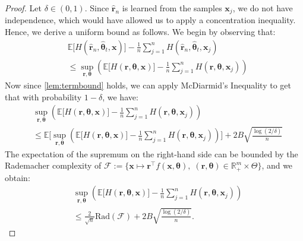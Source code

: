 \begin{proof}
    Let $\delta \in (0,1)$. Since $\hat{\boldsymbol{r}}_{n}$ is learned from the samples $\boldsymbol{x}_j$, we do not have independence, which would have allowed us to apply a concentration inequality. Hence, we derive a uniform bound as follows. We begin by observing that:
    \[
    \begin{aligned}
        &\mathbb{E}\bigg[H(\hat{\boldsymbol{r}}_{n}, \hat{\boldsymbol{\theta}}_t, \boldsymbol{x})\bigg] - \frac{1}{n}\sum_{j=1}^{n}H(\hat{\boldsymbol{r}}_{n}, \hat{\boldsymbol{\theta}}_t, \boldsymbol{x}_j) \\
        &\leq \sup_{\boldsymbol{r}, \boldsymbol{\theta}} \left(\mathbb{E}\bigg[H(\boldsymbol{r}, \boldsymbol{\theta}, \boldsymbol{x})\bigg] - \frac{1}{n}\sum_{j=1}^{n}H(\boldsymbol{r}, \boldsymbol{\theta}, \boldsymbol{x}_j)\right)
    \end{aligned}
    \]
    Now since \cref{lem:termbound} holds, we can apply McDiarmid's Inequality to get that with probability $1-\delta$, we have:
    \begin{align*}
    &\sup_{\boldsymbol{r}, \boldsymbol{\theta}} \left(\mathbb{E}\bigg[ H(\boldsymbol{r}, \boldsymbol{\theta}, \boldsymbol{x}) \bigg] - \frac{1}{n}\sum_{j=1}^{n}H(\boldsymbol{r}, \boldsymbol{\theta}, \boldsymbol{x}_j)\right) \\
    &\leq \mathbb{E}\bigg[\sup_{\boldsymbol{r}, \boldsymbol{\theta}} \left( \mathbb{E}\big[H(\boldsymbol{r}, \boldsymbol{\theta}, \boldsymbol{x}) \big] - \frac{1}{n}\sum_{j=1}^{n}H(\boldsymbol{r}, \boldsymbol{\theta}, \boldsymbol{x}_j) \right)\bigg] + 2B\sqrt{\frac{\log(2/\delta)}{n}}
    \end{align*}
    The expectation of the supremum on the right-hand side can be bounded by the Rademacher complexity of  $\mathcal{F} := \{ \boldsymbol{x} \mapsto \boldsymbol{r}^\top f(\boldsymbol{x}, \boldsymbol{\theta}), \; (\boldsymbol{r}, \boldsymbol{\theta}) \in\mathbb{R}_{+}^m\times\Theta\}$, and we obtain:
    \begin{equation}
    \begin{aligned}
    &\sup_{\boldsymbol{r}, \boldsymbol{\theta}} \left(\mathbb{E}\big[H(\boldsymbol{r}, \boldsymbol{\theta}, \boldsymbol{x}) \big] - \frac{1}{n}\sum_{j=1}^{n}H(\boldsymbol{r}, \boldsymbol{\theta}, \boldsymbol{x}_j)\right) \\
    &\leq \frac{2}{\sqrt{n}} \text{Rad}(\mathcal{F}) + 2B\sqrt{\frac{\log(2/\delta)}{n}}.
    \end{aligned}
    \end{equation}
\end{proof}


